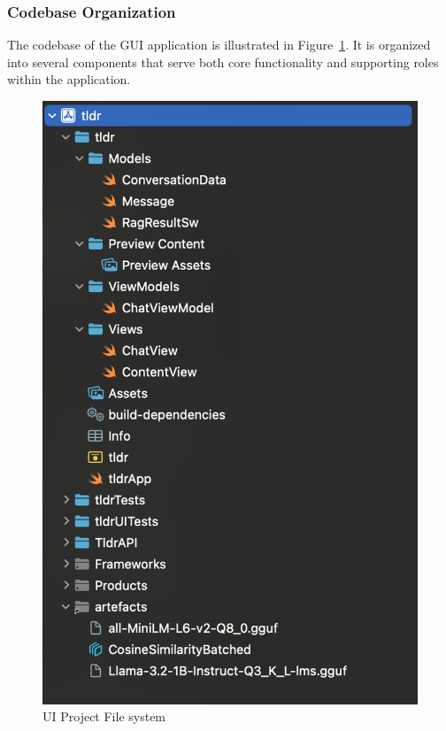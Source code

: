 \subsubsection{Codebase Organization}
\label{subsubsec:AppDesignModules-UICodebase}

The codebase of the GUI application is illustrated in Figure~\ref{fig:tldrUIFs}. It is organized into several components that serve both core functionality and supporting roles within the application. 
\begin{figure}[H]
    \centering
    \includegraphics[width=0.5\linewidth]{images/ui-proj-fs.png}
    \caption{UI Project File system}
    \label{fig:tldrUIFs}
\end{figure}
